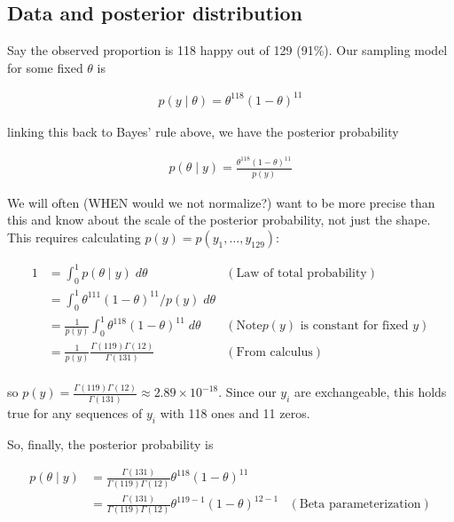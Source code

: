 \documentclass[]{article}
\begin{document}
\hypertarget{data-and-posterior-distribution}{%
\subsection{Data and posterior
distribution}\label{data-and-posterior-distribution}}

Say the observed proportion is 118 happy out of 129 (91\%). Our sampling
model for some fixed \(\theta\) is

\begin{align}
p(y \mid \theta) = \theta^{118} (1 - \theta)^{11}
\end{align}

linking this back to Bayes' rule above, we have the posterior
probability

\begin{align}
p(\theta \mid y) = \frac{\theta^{118} (1 - \theta)^{11}}{p(y)}
\end{align}

We will often (WHEN would we not normalize?) want to be more precise
than this and know about the scale of the posterior probability, not
just the shape. This requires calculating
\(p(y) = p(y_1, \dots, y_{129})\):

\begin{align}
1 &= \int_0^1 p(\theta \mid y) \; d\theta & (\text{Law of total probability}) \\
&= \int_0^1 \theta^{111} (1 - \theta)^{11} / p(y) \; d\theta \\
&= \frac{1}{p(y)} \int_0^1 \theta^{118} (1 - \theta)^{11} \; d\theta & (\text{Note
$p(y)$ is constant for fixed $y$})\\
&= \frac{1}{p(y)} \frac{\Gamma(119) \Gamma(12)}{\Gamma(131)} & (\text{From calculus})\\
\end{align}

so
\(p(y) = \frac{\Gamma(119) \Gamma(12)}{\Gamma(131)} \approx 2.89 \times 10^{-18}\).
Since our \(y_i\) are exchangeable, this holds true for any sequences of
\(y_i\) with 118 ones and 11 zeros.

So, finally, the posterior probability is

\begin{align}
p(\theta \mid y) &= \frac{\Gamma(131)}{\Gamma(119) \Gamma(12)} \theta^{118} (1 -
\theta)^11 \\
&= \frac{\Gamma(131)}{\Gamma(119) \Gamma(12)} \theta^{119 - 1} (1 - \theta)^{12 - 1} & (\text{Beta parameterization})\\
\end{align}
\end{document}
